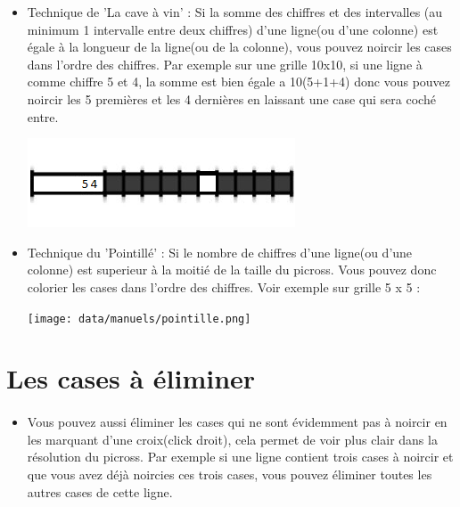 \begin{itemize}
		\item Technique de 'La cave à vin' : Si la somme des chiffres et des intervalles (au minimum 1 intervalle entre deux chiffres) d'une ligne(ou d'une colonne) est égale à la longueur de la ligne(ou de la colonne), vous pouvez noircir les cases dans l'ordre des chiffres. Par exemple sur une grille 10x10, si une ligne à comme chiffre 5 et 4, la somme est bien égale a 10(5+1+4) donc vous pouvez noircir les 5 premières et les 4 dernières en laissant une case qui sera coché entre.\\
		
	\begin{center}
		\includegraphics{data/manuels/sommeChiffreInterv.png}
	\end{center}
	
		\item Technique du 'Pointillé' : Si le nombre de chiffres d'une ligne(ou d'une colonne) est superieur à la moitié de la taille du picross. Vous pouvez donc colorier les cases dans l'ordre des chiffres. Voir exemple sur grille 5 x 5 :
		
	\begin{center}
		\texttt{[image: data/manuels/pointille.png]}
	\end{center} 
	
	
	\end{itemize}

\section{Les cases à éliminer}
	\paragraph{}
	\begin{itemize}
		\item Vous pouvez aussi éliminer les cases qui ne sont évidemment pas à noircir en les marquant d'une croix(click droit), cela permet de voir plus clair dans la résolution du picross. Par exemple si une ligne contient trois cases à noircir et que vous avez déjà noircies ces trois cases, vous pouvez éliminer toutes les autres cases de cette ligne.
	\end{itemize}

